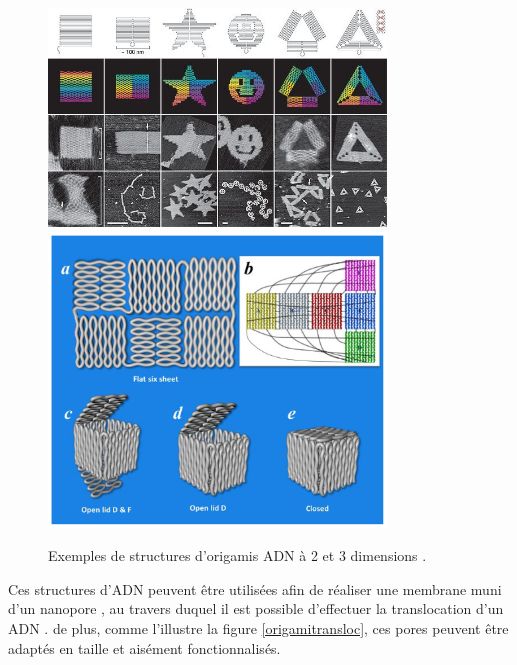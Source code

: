 \begin{figure}[H]
\begin{center}
\includegraphics[width=0.8\textwidth]{origami2d.jpg}
\includegraphics[width=0.8\textwidth]{origamis3d.png}

\caption[Origamis d'ADN]{Exemples de structures d'origamis ADN à 2\cite{Rothemund2006} et 3 dimensions \cite{Zadegan2012}.}
\label{origami}
\end{center}
\end{figure}

Ces structures d'ADN peuvent être utilisées afin de réaliser une membrane muni d'un nanopore \cite{2Bell2012}, au travers duquel il est possible d'effectuer la translocation d'un ADN \cite{HernndezAinsa2013}. de plus, comme l'illustre la figure \ref{origamitransloc}, ces pores peuvent être adaptés en taille et aisément fonctionnalisés.



